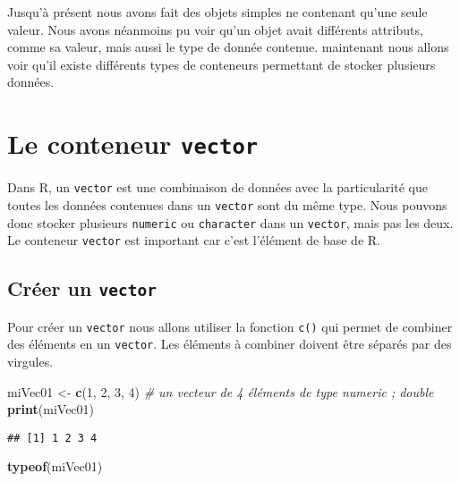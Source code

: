 \documentclass[]{book}
\newenvironment{Shaded}{\begin{snugshade}}{\end{snugshade}}
\newcommand{\KeywordTok}[1]{\textcolor[rgb]{0.13,0.29,0.53}{\textbf{#1}}}
\newcommand{\DecValTok}[1]{\textcolor[rgb]{0.00,0.00,0.81}{#1}}
\newcommand{\StringTok}[1]{\textcolor[rgb]{0.31,0.60,0.02}{#1}}
\newcommand{\CommentTok}[1]{\textcolor[rgb]{0.56,0.35,0.01}{\textit{#1}}}
\newcommand{\NormalTok}[1]{#1}
\theoremstyle{definition}
\theoremstyle{definition}
\theoremstyle{definition}
\theoremstyle{remark}
\begin{document}
Jusqu'à présent nous avons fait des objets simples ne contenant qu'une
seule valeur. Nous avons néanmoins pu voir qu'un objet avait différents
attributs, comme sa valeur, mais aussi le type de donnée contenue.
maintenant nous allons voir qu'il existe différents types de conteneurs
permettant de stocker plusieurs données.

\hypertarget{l014vector}{\section{\texorpdfstring{Le conteneur
\texttt{vector}}{Le conteneur vector}}\label{l014vector}}

Dans R, un \texttt{vector} est une combinaison de données avec la
particularité que toutes les données contenues dans un \texttt{vector}
sont du même type. Nous pouvons donc stocker plusieurs \texttt{numeric}
ou \texttt{character} dans un \texttt{vector}, mais pas les deux. Le
conteneur \texttt{vector} est important car c'est l'élément de base de
R.

\subsection{\texorpdfstring{Créer un
\texttt{vector}}{Créer un vector}}\label{creer-un-vector}

Pour créer un \texttt{vector} nous allons utiliser la fonction
\texttt{c()} qui permet de combiner des éléments en un \texttt{vector}.
Les éléments à combiner doivent être séparés par des virgules.

\begin{Shaded}
\begin{Highlighting}[]
\NormalTok{miVec01 <-}\StringTok{ }\KeywordTok{c}\NormalTok{(}\DecValTok{1}\NormalTok{, }\DecValTok{2}\NormalTok{, }\DecValTok{3}\NormalTok{, }\DecValTok{4}\NormalTok{) }\CommentTok{# un vecteur de 4 éléments de type numeric ; double}
\KeywordTok{print}\NormalTok{(miVec01)}
\end{Highlighting}
\end{Shaded}

\begin{verbatim}
## [1] 1 2 3 4
\end{verbatim}

\begin{Shaded}
\begin{Highlighting}[]
\KeywordTok{typeof}\NormalTok{(miVec01)}
\end{Highlighting}
\end{Shaded}
\end{document}

